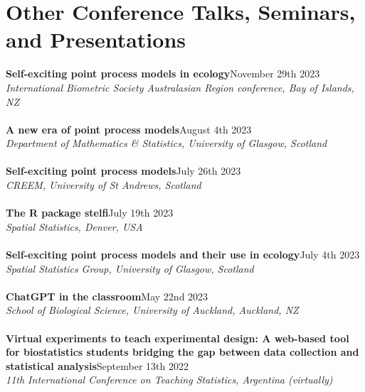 \documentclass[10pt,letter]{article}
\begin{document}
\section*{Other Conference Talks, Seminars, and Presentations}
\vspace{1mm}
{\textbf{Self-exciting point process models in ecology}}\hfill November 29th 2023\\
                 {\sl  International Biometric Society Australasian Region conference, Bay of Islands, NZ}\\
                 \hdashrule[0.5ex]{4cm}{1pt}{1pt}\\
{\textbf{A new era of point process models}}\hfill August 4th 2023\\
                 {\sl Department of Mathematics \& Statistics, University of Glasgow, Scotland}\\
                 \hdashrule[0.5ex]{4cm}{1pt}{1pt}\\
{\textbf{Self-exciting point process models}}\hfill July 26th 2023\\
                 {\sl CREEM, University of St Andrews, Scotland }\\
                 \hdashrule[0.5ex]{4cm}{1pt}{1pt}\\
 {\textbf{The R package stelfi}}\hfill July 19th 2023\\
                 {\sl  Spatial Statistics, Denver, USA}\\
                 \hdashrule[0.5ex]{4cm}{1pt}{1pt}\\
{\textbf{Self-exciting point process models and their use in ecology}}\hfill July 4th 2023\\
                 {\sl Spatial Statistics Group, University of Glasgow, Scotland}\\
                 \hdashrule[0.5ex]{4cm}{1pt}{1pt}\\
                 {\textbf{ChatGPT in the classroom}}\hfill May 22nd 2023\\
                 {\sl  School of Biological Science, University of Auckland, Auckland, NZ}\\
                 \hdashrule[0.5ex]{4cm}{1pt}{1pt}\\
                 {\textbf{Virtual experiments to teach experimental design: A web-based tool for biostatistics students bridging the gap between data collection and statistical analysis}}\hfill September 13th 2022\\
                 {\sl  11th International Conference on Teaching Statistics, Argentina (virtually)}\\
\end{document}
